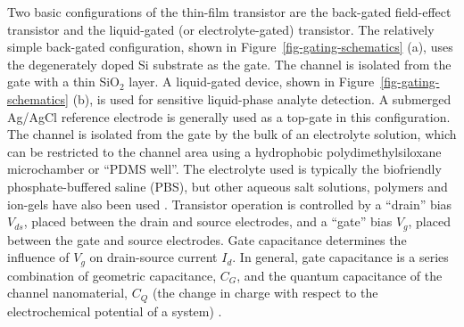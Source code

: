 \documentclass[
  a4paper,
]{scrbook}
\begin{document}
Two basic configurations of the thin-film transistor are the back-gated
field-effect transistor and the liquid-gated (or electrolyte-gated)
transistor. The relatively simple back-gated configuration, shown in
Figure~\ref{fig-gating-schematics} (a), uses the degenerately doped Si
substrate as the gate. The channel is isolated from the gate with a thin
SiO\(_2\) layer. A liquid-gated device, shown in
Figure~\ref{fig-gating-schematics} (b), is used for sensitive
liquid-phase analyte detection. A submerged Ag/AgCl reference electrode
is generally used as a top-gate in this configuration. The channel is
isolated from the gate by the bulk of an electrolyte solution, which can
be restricted to the channel area using a hydrophobic
polydimethylsiloxane microchamber or ``PDMS well''. The electrolyte used
is typically the biofriendly phosphate-buffered saline (PBS), but other
aqueous salt solutions, polymers and ion-gels have also been used
\autocite{Avouris2007,Shkodra2021,Tran2016,Li2023}. Transistor operation
is controlled by a ``drain'' bias \(V_{ds}\), placed between the drain
and source electrodes, and a ``gate'' bias \(V_g\), placed between the
gate and source electrodes. Gate capacitance determines the influence of
\(V_g\) on drain-source current \(I_d\). In general, gate capacitance is
a series combination of geometric capacitance, \(C_{G}\), and the
quantum capacitance of the channel nanomaterial, \(C_{Q}\) (the change
in charge with respect to the electrochemical potential of a system)
\autocite{Avouris2007,Cao2009,Heller2009a,Tran2016,Miranda2016,Kireev2017,Li2023}.
\end{document}
